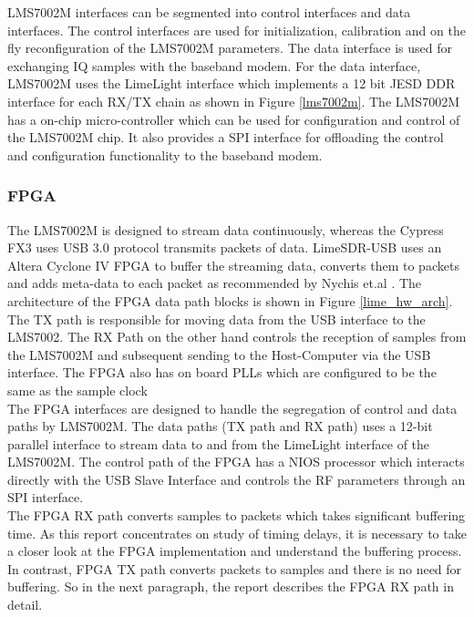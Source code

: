 LMS7002M interfaces can be segmented into control interfaces and data interfaces.
The control interfaces are used for initialization, calibration and on the fly reconfiguration of the LMS7002M parameters.
The data interface is used for exchanging \ac{IQ} samples with the baseband modem.
For the data interface, LMS7002M uses the LimeLight interface which implements a 12 bit JESD \ac{DDR} interface for each RX/TX chain as shown in Figure \ref{lms7002m}.
The LMS7002M has a on-chip micro-controller which can be used for configuration and control of the LMS7002M chip.
It also provides a \ac{SPI} interface for offloading the control and configuration functionality to the baseband modem.


\subsubsection{FPGA}

The LMS7002M is designed to stream data continuously, whereas the Cypress FX3 uses USB 3.0 protocol transmits packets of data.
LimeSDR-USB uses an Altera Cyclone IV \ac{FPGA} to buffer the streaming data, converts them to packets and adds meta-data to each packet as recommended by Nychis et.al \cite{nychis_enabling_nodate}.
The architecture of the FPGA data path blocks is shown in Figure \ref{lime_hw_arch}.
The TX path is responsible for moving data from the USB interface to the LMS7002.
The RX Path on the other hand controls the reception of samples from the LMS7002M and subsequent sending to the Host-Computer via the USB interface.
The \ac{FPGA} also has on board PLLs which are configured to be the same as the sample clock\\

The \ac{FPGA} interfaces are designed to handle the segregation of control and data paths by LMS7002M.
The data paths (TX path and RX path) uses a 12-bit parallel interface to stream data to and from the LimeLight interface of the LMS7002M.
The control path of the \ac{FPGA} has a NIOS processor which interacts directly with the USB Slave Interface and controls the \ac{RF} parameters through an \ac{SPI} interface.\\

The \ac{FPGA} RX path converts samples to packets which takes significant buffering time.
As this report concentrates on study of timing delays, it is necessary to take a closer look at the \ac{FPGA} implementation and understand the buffering process.
In contrast, \ac{FPGA} TX path converts packets to samples and there is no need for buffering.
So in the next paragraph, the report describes the \ac{FPGA} RX path in detail.
 

